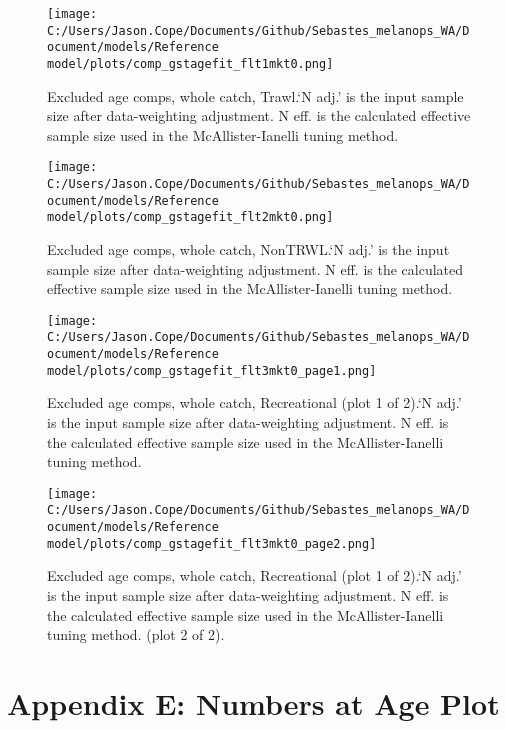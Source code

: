 \documentclass[11pt,
  english,
  letterpaper,
]{article}
\begin{document}
\begin{figure}
\centering
\texttt{[image: C:/Users/Jason.Cope/Documents/Github/Sebastes\_melanops\_WA/Document/models/Reference model/plots/comp\_gstagefit\_flt1mkt0.png]}
\caption{Excluded age comps, whole catch, Trawl.`N adj.' is the input sample size after data-weighting adjustment. N eff. is the calculated effective sample size used in the McAllister-Ianelli tuning method.\label{fig:comp_gstagefit_flt1mkt0}}
\end{figure}

\begin{figure}
\centering
\texttt{[image: C:/Users/Jason.Cope/Documents/Github/Sebastes\_melanops\_WA/Document/models/Reference model/plots/comp\_gstagefit\_flt2mkt0.png]}
\caption{Excluded age comps, whole catch, NonTRWL.`N adj.' is the input sample size after data-weighting adjustment. N eff. is the calculated effective sample size used in the McAllister-Ianelli tuning method.\label{fig:comp_gstagefit_flt2mkt0}}
\end{figure}

\begin{figure}
\centering
\texttt{[image: C:/Users/Jason.Cope/Documents/Github/Sebastes\_melanops\_WA/Document/models/Reference model/plots/comp\_gstagefit\_flt3mkt0\_page1.png]}
\caption{Excluded age comps, whole catch, Recreational (plot 1 of 2).`N adj.' is the input sample size after data-weighting adjustment. N eff. is the calculated effective sample size used in the McAllister-Ianelli tuning method.\label{fig:comp_gstagefit_flt3mkt0_page1}}
\end{figure}

\begin{figure}
\centering
\texttt{[image: C:/Users/Jason.Cope/Documents/Github/Sebastes\_melanops\_WA/Document/models/Reference model/plots/comp\_gstagefit\_flt3mkt0\_page2.png]}
\caption{Excluded age comps, whole catch, Recreational (plot 1 of 2).`N adj.' is the input sample size after data-weighting adjustment. N eff. is the calculated effective sample size used in the McAllister-Ianelli tuning method. (plot 2 of 2).\label{fig:comp_gstagefit_flt3mkt0_page2}}
\end{figure}

\clearpage

\hypertarget{app-e}{%
\section{Appendix E: Numbers at Age Plot}\label{app-e}}
\end{document}
